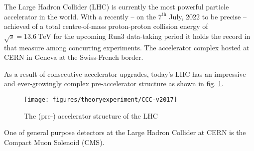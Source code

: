 \label{sec:theory}

The Large Hadron Collider (LHC) is currently the most powerful particle accelerator in the world. With a recently -- on the $\text{7}^{\text{th}}$ July, 2022 to be precise -- achieved of a total centre-of-mass proton-proton collision energy of $\sqrt{s} = \SI{13.6}{\tera\electronvolt}$ for the upcoming Run3 data-taking period it holds the record in that measure among concurring experiments. The accelerator complex hosted at CERN in Geneva at the Swiss-French border.

As a result of consecutive accelerator upgrades, today's LHC has an impressive and ever-growingly complex pre-accelerator structure as shown in fig. \ref{fig:lhcstructure}.

\begin{figure}[h!]
	\centering
	\texttt{[image: figures/theoryexperiment/CCC-v2017]}
	\caption{The (pre-) accelerator structure of the LHC \cite{Mobs:2197559}}
	\label{fig:lhcstructure}
\end{figure}



One of general purpose detectors at the Large Hadron Collider at CERN is the Compact Muon Solenoid (CMS).
